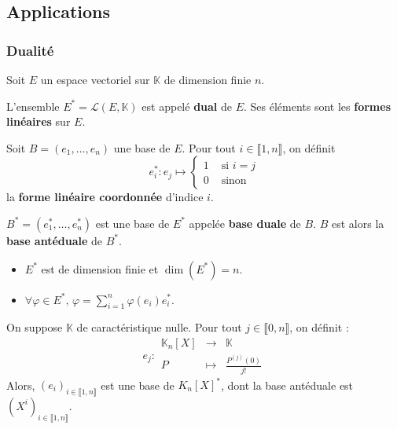   \subsection{Applications}

  \subsubsection{Dualité}

  Soit $E$ un espace vectoriel sur $\mathbb{K}$ de dimension finie $n$.

  \begin{definition}
    L'ensemble $E^* = \mathcal{L}(E, \mathbb{K})$ est appelé \textbf{dual} de $E$. Ses éléments sont les \textbf{formes linéaires} sur $E$.
  \end{definition}

  \begin{definition}
    Soit $B = (e_1, \dots, e_n)$ une base de $E$. Pour tout $i \in \llbracket 1, n \rrbracket$, on définit
    \[
    e_i^* : e_j \mapsto
    \begin{cases}
      1 &\text{ si } i = j \\
      0 &\text{ sinon}
    \end{cases}
    \]
    la \textbf{forme linéaire coordonnée} d'indice $i$.
  \end{definition}

  \begin{theorem}
    $B^* = (e_1^*, \dots, e_n^*)$ est une base de $E^*$ appelée \textbf{base duale} de $B$. $B$ est alors la \textbf{base antéduale} de $B^*$.
  \end{theorem}

  \begin{corollary}
    \begin{itemize}
      \item $E^*$ est de dimension finie et $\dim(E^*) = n$.
      \item $\forall \varphi \in E^*, \, \varphi = \sum_{i=1}^n \varphi(e_i) e_i^*$.
    \end{itemize}
  \end{corollary}


  \begin{application}
    On suppose $\mathbb{K}$ de caractéristique nulle. Pour tout $j \in \llbracket 0, n \rrbracket$, on définit :
    \[
      e_j : \begin{array}{ccc}
        \mathbb{K}_n[X] &\rightarrow& \mathbb{K} \\
        P &\mapsto& \frac{P^{(j)}(0)}{j!}
      \end{array}
    \]
    Alors, $(e_i)_{i \in \llbracket 1, n \rrbracket}$ est une base de $K_n[X]^*$, dont la base antéduale est $(X^i)_{i \in \llbracket 1, n \rrbracket}$.
  \end{application}

